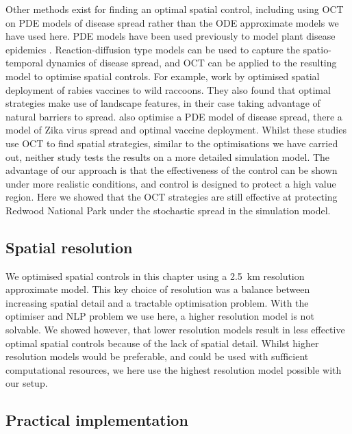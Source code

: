 Other methods exist for finding an optimal spatial control, including using OCT on PDE models of disease spread rather than the ODE approximate models we have used here. PDE models have been used previously to model plant disease epidemics \citep[e.g.][]{white_role_2006}. Reaction-diffusion type models can be used to capture the spatio-temporal dynamics of disease spread, and OCT can be applied to the resulting model to optimise spatial controls. For example, work by \citet{neilan_optimal_2011} optimised spatial deployment of rabies vaccines to wild raccoons. They also found that optimal strategies make use of landscape features, in their case taking advantage of natural barriers to spread. \citet{miyaoka_optimal_2019} also optimise a PDE model of disease spread, there a model of Zika virus spread and optimal vaccine deployment. Whilst these studies use OCT to find spatial strategies, similar to the optimisations we have carried out, neither study tests the results on a more detailed simulation model. The advantage of our approach is that the effectiveness of the control can be shown under more realistic conditions, and control is designed to protect a high value region. Here we showed that the OCT strategies are still effective at protecting Redwood National Park under the stochastic spread in the simulation model.

\subsection{Spatial resolution}

We optimised spatial controls in this chapter using a \SI{2.5}{\km} resolution approximate model. This key choice of resolution was a balance between increasing spatial detail and a tractable optimisation problem. With the optimiser and NLP problem we use here, a higher resolution model is not solvable. We showed however, that lower resolution models result in less effective optimal spatial controls because of the lack of spatial detail. Whilst higher resolution models would be preferable, and could be used with sufficient computational resources, we here use the highest resolution model possible with our setup.

\subsection{Practical implementation}

